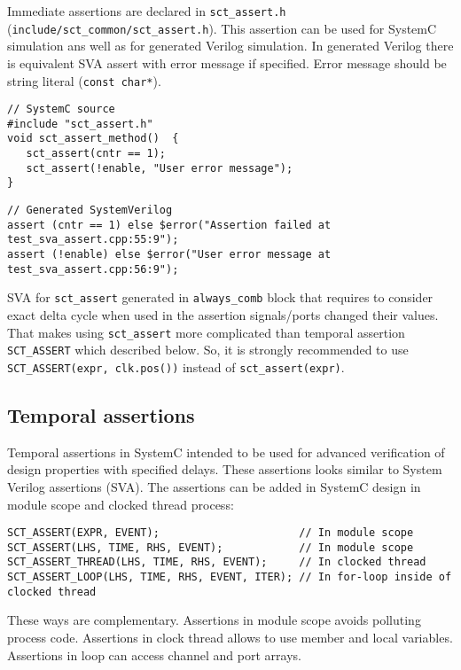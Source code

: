 Immediate assertions are declared in {\tt sct\_assert.h} ({\tt include/sct\_common/sct\_assert.h}). This assertion can be used for SystemC simulation ans well as for generated Verilog simulation. In generated Verilog there is equivalent SVA assert with error message if specified. Error message should be string literal ({\tt const char*}).

\begin{lstlisting}[style=mycpp]
// SystemC source
#include "sct_assert.h"
void sct_assert_method()  {
   sct_assert(cntr == 1);
   sct_assert(!enable, "User error message");
}
\end{lstlisting}
%
\begin{lstlisting}[style=myverilog]
// Generated SystemVerilog
assert (cntr == 1) else $error("Assertion failed at test_sva_assert.cpp:55:9");
assert (!enable) else $error("User error message at test_sva_assert.cpp:56:9");
\end{lstlisting}

SVA for {\tt sct\_assert} generated in {\tt always\_comb} block that requires to consider exact delta cycle when used in the assertion signals/ports changed their values. That makes using {\tt sct\_assert} more complicated than temporal assertion {\tt SCT\_ASSERT} which described below. So, it is strongly recommended to use {\tt SCT\_ASSERT(expr, clk.pos())} instead of {\tt sct\_assert(expr)}.

\subsection{Temporal assertions}

Temporal assertions in SystemC intended to be used for advanced verification of design properties with specified delays. These assertions looks similar to System Verilog assertions (SVA). The assertions can be added in SystemC design in module scope and clocked thread process:

\begin{lstlisting}[style=mycpp]
SCT_ASSERT(EXPR, EVENT);                      // In module scope 
SCT_ASSERT(LHS, TIME, RHS, EVENT);            // In module scope 
SCT_ASSERT_THREAD(LHS, TIME, RHS, EVENT);     // In clocked thread 
SCT_ASSERT_LOOP(LHS, TIME, RHS, EVENT, ITER); // In for-loop inside of clocked thread
\end{lstlisting}

These ways are complementary. Assertions in module scope avoids polluting process code. Assertions in clock thread allows to use member and local variables. Assertions in loop can access channel and port arrays.

